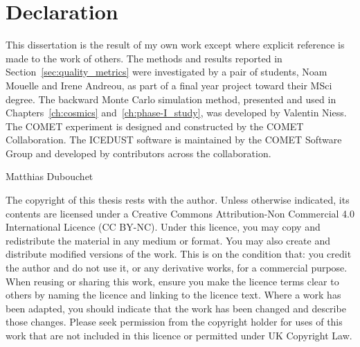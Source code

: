 
\chapter*{Declaration}
This dissertation is the result of my own work except where explicit reference
is made to the work of others. 
The methods and results reported in Section~\ref{sec:quality_metrics} were
investigated by a pair of students, Noam Mouelle and Irene Andreou, as part of a
final year project toward their MSci degree. 
The backward Monte Carlo simulation method, presented and used in
Chapters~\ref{ch:cosmics} and~\ref{ch:phase-I_study}, was developed by Valentin
Niess. 
The COMET experiment is designed and constructed by the COMET Collaboration. The
ICEDUST software is maintained by the COMET Software Group and developed by
contributors across the collaboration.

\hfill Matthias Dubouchet

\vspace{2cm}
The copyright of this thesis rests with the author. Unless otherwise indicated, 
its contents are licensed under a Creative Commons Attribution-Non 
Commercial 4.0 International Licence (CC BY-NC). 
Under this licence, you may copy and redistribute the material in any medium 
or format. You may also create and distribute modified versions of the work. 
This is on the condition that: you credit the author and do not use it, or any 
derivative works, for a commercial purpose. 
When reusing or sharing this work, ensure you make the licence terms clear to 
others by naming the licence and linking to the licence text. Where a work has 
been adapted, you should indicate that the work has been changed and 
describe those changes. 
Please seek permission from the copyright holder for uses of this work that are 
not included in this licence or permitted under UK Copyright Law.